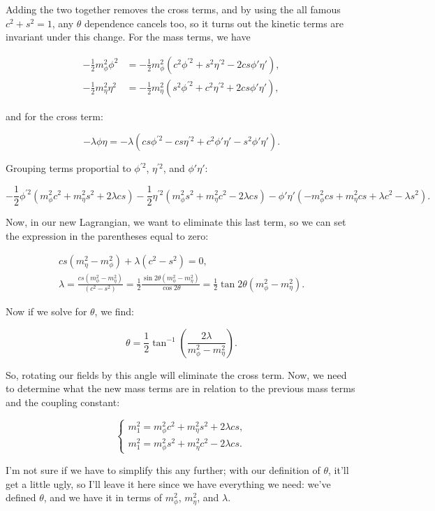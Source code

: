 Adding the two together removes the cross terms, and by using the all famous $c^2 + s^2 = 1$, any $\theta$ dependence cancels too, so it turns out the kinetic terms are invariant under this change. For the mass terms, we have

\begin{align*}
    -\frac{1}{2}m_{\phi}^2\phi^2 &= -\frac{1}{2}m_{\phi}^2(c^2\phi^{\prime2} + s^2\eta^{\prime2} - 2cs\phi'\eta'), \\
    -\frac{1}{2}m_{\eta}^2\eta^2 &= -\frac{1}{2}m_{\eta}^2(s^2\phi^{\prime2} + c^2\eta^{\prime2} + 2cs\phi'\eta'),
\end{align*}

and for the cross term:

\begin{equation*}
    -\lambda\phi\eta = -\lambda(cs\phi^{\prime2} -cs\eta^{\prime2} + c^2 \phi'\eta' - s^2\phi'\eta').
\end{equation*}

Grouping terms proportial to $\phi^{\prime2}$, $\eta^{\prime2}$, and $\phi'\eta'$:

\begin{equation*}
    -\frac{1}{2}\phi^{\prime2}(m_{\phi}^2 c^2 + m_{\eta}^2 s^2 + 2\lambda cs) - \frac{1}{2}\eta^{\prime2}(m_{\phi}^2 s^2 + m_{\eta}^2 c^2 - 2\lambda cs) - \phi'\eta'(-m_{\phi}^2 cs + m_{\eta}^2 cs + \lambda c^2 - \lambda s^2).
\end{equation*}

Now, in our new Lagrangian, we want to eliminate this last term, so we can set the expression in the parentheses equal to zero:

\begin{gather*}
    cs(m_{\eta}^2 - m_{\phi}^2) + \lambda(c^2 - s^2) = 0, \\
    \lambda = \frac{cs(m_{\phi}^2 - m_{\eta}^2)}{(c^2-s^2)} = \frac{1}{2} \frac{\sin2\theta(m_{\phi}^2 - m_{\eta}^2)}{\cos2\theta} = \frac{1}{2}\tan2\theta(m_{\phi}^2 - m_{\eta}^2).
\end{gather*}

Now if we solve for $\theta$, we find:

\begin{equation*}
    \theta = \frac{1}{2}\tan^{-1}\left( \frac{2\lambda}{m_{\phi}^2 - m_{\eta}^2} \right).
\end{equation*}

So, rotating our fields by this angle will eliminate the cross term. Now, we need to determine what the new mass terms are in relation to the previous mass terms and the coupling constant:

\begin{equation*}
    \begin{cases}
        m_1^2 = m_{\phi}^2 c^2 + m_{\eta}^2 s^2 + 2\lambda cs, \\
        m_1^2 = m_{\phi}^2 s^2 + m_{\eta}^2 c^2 - 2\lambda cs.
    \end{cases}
\end{equation*}

I'm not sure if we have to simplify this any further; with our definition of $\theta$, it'll get a little ugly, so I'll leave it here since we have everything we need: we've defined $\theta$, and we have it in terms of $m_{\phi}^2$, $m_{\eta}^2$, and $\lambda$.